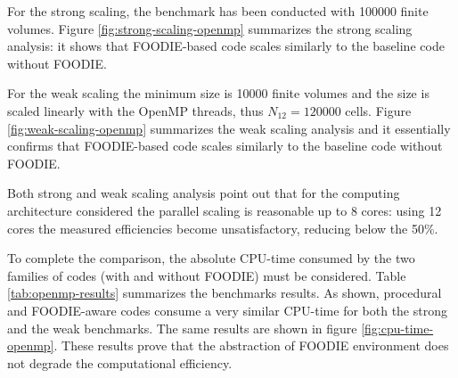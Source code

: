 For the strong scaling, the benchmark has been conducted with 100000 finite volumes. Figure \ref{fig:strong-scaling-openmp} summarizes the strong scaling analysis: it shows that FOODIE-based code scales similarly to the baseline code without FOODIE.

For the weak scaling the minimum size is 10000 finite volumes and the size is scaled linearly with the OpenMP threads, thus $N_{12} = 120000$ cells. Figure \ref{fig:weak-scaling-openmp} summarizes the weak scaling analysis and it essentially confirms that FOODIE-based code scales similarly to the baseline code without FOODIE.

Both strong and weak scaling analysis point out that for the computing architecture considered the parallel scaling is reasonable up to 8 cores: using 12 cores the measured efficiencies become unsatisfactory, reducing below the 50\%.

To complete the comparison, the absolute CPU-time consumed by the two families of codes (with and without FOODIE) must be considered. Table \ref{tab:openmp-results} summarizes the benchmarks results. As shown, procedural and FOODIE-aware codes consume a very similar CPU-time for both the strong and the weak benchmarks. The same results are shown in figure \ref{fig:cpu-time-openmp}. These results prove that the abstraction of FOODIE environment does not degrade the computational efficiency.

